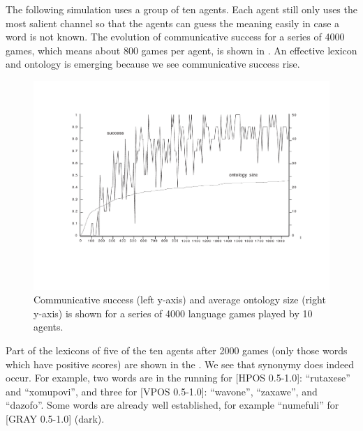 The following simulation uses a group of ten agents. 
Each agent still only uses the most salient channel so that 
the agents can guess the meaning easily in case a word is not known. 
The evolution of communicative success for a series of 
4000 games, which means about 800 games per agent, 
is shown in . 
An effective lexicon and ontology is 
emerging because we see communicative success rise. 


\begin{figure}[htbp]
  \centerline{\includegraphics[width=.70\textwidth]{chap6/figs/gsucc2}}
\caption{\label{gsucc2} Communicative 
success (left y-axis) and average ontology size 
(right y-axis) is shown for a series of 4000
language games played by 10 agents.} 
\end{figure}

Part of the lexicons of five of the ten agents after 2000 games 
(only those words which have positive scores) are shown in the 
. We see that synonymy does indeed occur. For
example, two words are in the 
running for [HPOS 0.5-1.0]: ``rutaxese'' and ``xomupovi'', and 
three for [VPOS 0.5-1.0]: ``wavone'', ``zaxawe'', and 
``dazofo''. Some words are already well established, for
example ``numefuli'' for [GRAY 0.5-1.0] (dark). 


